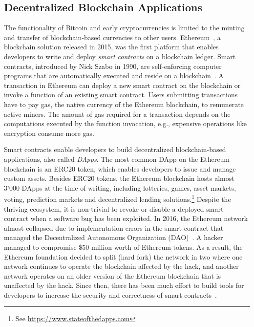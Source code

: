 \subsection{Decentralized Blockchain Applications}
The functionality of Bitcoin and early cryptocurrencies is limited to the minting and transfer of blockchain-based currencies to other users.
Ethereum~\cite{wood2014ethereum}, a blockchain solution released in 2015, was the first platform that enables developers to write and deploy \emph{smart contracts} on a blockchain ledger.
Smart contracts, introduced by Nick Szabo in 1990, are self-enforcing computer programs that are automatically executed and reside on a blockchain~\cite{szabo1996smart}.
A transaction in Ethereum can deploy a new smart contract on the blockchain or invoke a function of an existing smart contract.
Users submitting transactions have to pay gas, the native currency of the Ethereum blockchain, to remunerate active miners.
The amount of gas required for a transaction depends on the computations executed by the function invocation, e.g., expensive operations like encryption consume more gas.


Smart contracts enable developers to build decentralized blockchain-based applications, also called \emph{DApps}.
The most common DApp on the Ethereum blockchain is an ERC20 token, which enables developers to issue and manage custom assets.
Besides ERC20 tokens, the Ethereum blockchain hosts almost 3'000 DApps at the time of writing, including lotteries, games, asset markets, voting, prediction markets and decentralized lending solutions.\footnote{See \url{https://www.stateofthedapps.com}}
Despite the thriving ecosystem, it is non-trivial to revoke or disable a deployed smart contract when a software bug has been exploited.
In 2016, the Ethereum network almost collapsed due to implementation errors in the smart contract that managed the Decentralized Autonomous Organization (DAO)~\cite{mehar2019understanding}.
A hacker managed to compromise \$50 million worth of Ethereum tokens.
As a result, the Ethereum foundation decided to split (hard fork) the network in two where one network continues to operate the blockchain affected by the hack, and another network operates on an older version of the Ethereum blockchain that is unaffected by the hack.
Since then, there has been much effort to build tools for developers to increase the security and correctness of smart contracts~\cite{breidenbach2018enter}.

